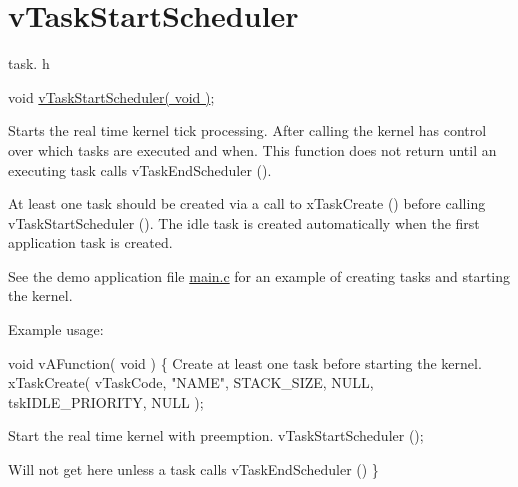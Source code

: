 \hypertarget{group__v_task_start_scheduler}{\section{v\-Task\-Start\-Scheduler}
\label{group__v_task_start_scheduler}
}
task. h 
\begin{DoxyPre}void \hyperlink{tasks_8c_a598661cdd2a6af95a077245d11e3d142}{vTaskStartScheduler( void )};\end{DoxyPre}


Starts the real time kernel tick processing. After calling the kernel has control over which tasks are executed and when. This function does not return until an executing task calls v\-Task\-End\-Scheduler ().

At least one task should be created via a call to x\-Task\-Create () before calling v\-Task\-Start\-Scheduler (). The idle task is created automatically when the first application task is created.

See the demo application file \hyperlink{main_8c}{main.\-c} for an example of creating tasks and starting the kernel.

Example usage\-: 
\begin{DoxyPre}
 void vAFunction( void )
 \{
Create at least one task before starting the kernel.
     xTaskCreate( vTaskCode, "NAME", STACK\_SIZE, NULL, tskIDLE\_PRIORITY, NULL );\end{DoxyPre}



\begin{DoxyPre}Start the real time kernel with preemption.
     vTaskStartScheduler ();\end{DoxyPre}



\begin{DoxyPre}Will not get here unless a task calls vTaskEndScheduler ()
 \}
   \end{DoxyPre}
 